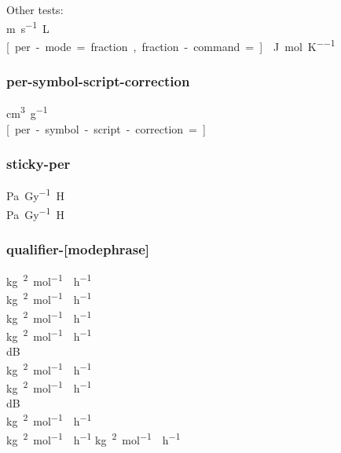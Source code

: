\documentclass{article}
\begin{document}
\newcommand{\myfraction}[2]{#1~\text{over }#2}
Other tests:\\
\unit[per-mode=single-symbol]{\meter\per\second\liter}\\
\unit[per-mode=fraction, fraction-command=\myfraction]{\joule\per\mole\per\kelvin}

\subsubsection{per-symbol-script-correction}
{
%
\unit{\cm\cubed\per\gram} \\
\unit[per-symbol-script-correction = ]{\cm\cubed\per\gram} %
}

\subsubsection{sticky-per}
\unit{\pascal\per\gray\henry} \\
\unit[sticky-per]{\pascal\per\gray\henry}

\subsubsection{qualifier-[mode\textbar phrase]}
\unit{\kilogram\polymer\squared\per\mole\catalyst\per\hour} \\
\unit[qualifier-mode = bracket]{\kilogram\polymer\squared\per\mole\catalyst\per\hour} \\
\unit[qualifier-mode = subscript]{\kilogram\polymer\squared\per\mole\catalyst\per\hour} \\
\unit[qualifier-mode = phrase, qualifier-phrase=\ ]{\kilogram\polymer\squared\per\mole\catalyst\per\hour} \\
\unit[qualifier-mode = combine]{\deci\bel\isotropic}\\
\unit{\kilogram{}\squared\per\mole{}\per\hour} \\
\unit[qualifier-mode = bracket]{\kilogram{}\squared\per\mole{}\per\hour} \\
\unit[qualifier-mode = combine]{\deci\bel{}} \\
{
%
\unit{\kilogram{}\squared\per\mole{}\per\hour} \\
%
\unit{\kilogram{}\squared\per\mole{}\per\hour}
}
\unit[qualifier-mode = phrase, qualifier-phrase = { by }]{\kilogram\polymer\squared\per\mole\catalyst\per\hour}
\end{document}
